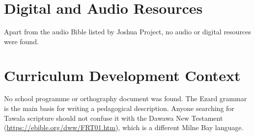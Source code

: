 \documentclass[12pt]{article}
\begin{document}
\section{Digital and Audio Resources}
Apart from the audio Bible listed by Joshua Project, no audio or digital resources were found.

\section{Curriculum Development Context}
No school programme or orthography document was found. The Ezard grammar is the main basis for writing a pedagogical description. Anyone searching for Tawala scripture should not confuse it with the Dawawa New Testament (\url{https://ebible.org/dww/FRT01.htm}), which is a different Milne Bay language.
\end{document}
